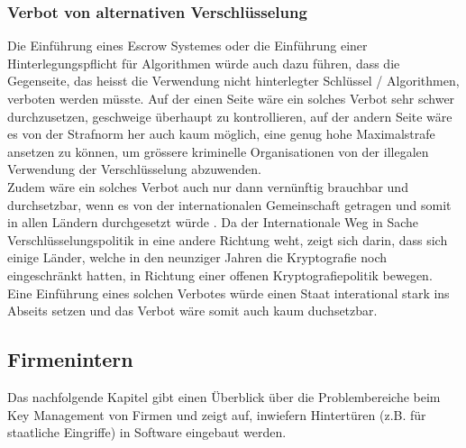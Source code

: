 	
	\subsubsection{Verbot von alternativen Verschlüsselung}
Die Einführung eines Escrow Systemes oder die Einführung einer Hinterlegungspflicht für Algorithmen würde auch dazu führen, dass die Gegenseite, das heisst die Verwendung nicht hinterlegter Schlüssel / Algorithmen, verboten werden müsste. Auf der einen Seite wäre ein solches Verbot sehr schwer durchzusetzen, geschweige überhaupt zu kontrollieren, auf der andern Seite wäre es von der Strafnorm her auch kaum möglich, eine genug hohe Maximalstrafe ansetzen zu können, um grössere kriminelle Organisationen von der illegalen Verwendung der Verschlüsselung abzuwenden. \cite{adminch} \\ %
Zudem wäre ein solches Verbot auch nur dann vernünftig brauchbar und durchsetzbar, wenn es von der internationalen Gemeinschaft getragen und somit in allen Ländern durchgesetzt würde \cite{denning}. Da der Internationale Weg in Sache Verschlüsselungspolitik in eine andere Richtung weht, zeigt sich darin, dass sich einige Länder, welche in den neunziger Jahren die Kryptografie noch eingeschränkt hatten, in Richtung einer offenen Kryptografiepolitik bewegen. \cite{clipperchip} \cite{adminch} \\ %
Eine Einführung eines solchen Verbotes würde einen Staat interational stark ins Abseits setzen und das Verbot wäre somit auch kaum duchsetzbar.
		
	\subsection{Firmenintern}
Das nachfolgende Kapitel gibt einen Überblick über die Problembereiche beim Key Management von Firmen und zeigt auf, inwiefern Hintertüren (z.B. für staatliche Eingriffe) in Software eingebaut werden.

